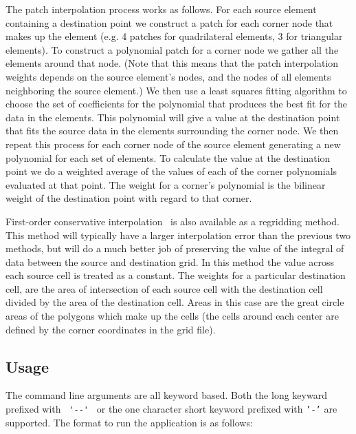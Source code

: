The patch interpolation process works as follows. 
For each source element containing a destination point
we construct a patch for each corner node that makes up the element (e.g. 4 patches for 
quadrilateral elements, 3 for triangular elements). To construct a polynomial patch for
 a corner node we gather all the elements around that node. 
(Note that this means that the patch interpolation weights depends on the source 
element's nodes, and the nodes of all elements neighboring the source element.)  
We then use a least squares fitting algorithm to choose the set of coefficients 
for the polynomial that produces the best fit for the data in the elements. 
This polynomial will give a value at the destination point that fits the source data 
in the elements surrounding the corner node. We then repeat this process for each 
corner node of the source element generating a new polynomial for each set of elements.  
To calculate the value at the destination point we do a weighted average of the values 
of each of the corner polynomials evaluated at that point. The weight for a corner's 
polynomial is the bilinear weight of the destination point with regard to that corner.  

First-order conservative interpolation~\cite{ConservativeOrder1} is also available as a regridding method. This method will typically have  
a larger interpolation error than the previous two methods, but will do a much better job of preserving the value of the 
integral of data between the source and destination grid. In this method the value across each source cell
is treated as a constant. The weights for a particular destination cell, are the area of intersection of each 
source cell with the destination cell divided by the area of the destination cell.
Areas in this case are the great circle 
areas of the polygons which make up the cells (the cells around each center are defined by the corner coordinates 
in the grid file). 

\subsection{Usage}

The command line arguments are all keyword based.  Both the long keyward prefixed with \verb+ '--' + or the 
one character short keyword prefixed with {\tt '-'} are supported.  The format to run the application is 
as follows:

